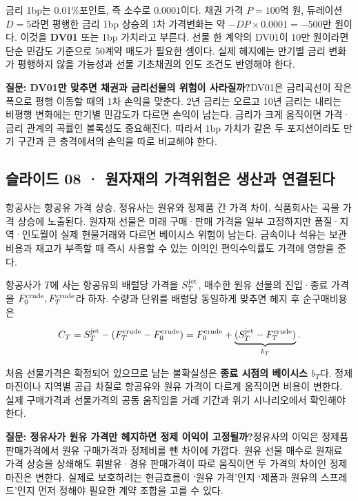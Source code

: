 \documentclass[11pt,a4paper]{article}
\begin{document}
금리 1bp는 0.01\%포인트, 즉 소수로 $0.0001$이다. 채권 가격 $P=100$억 원, 듀레이션 $D=5$라면 평행한 금리 1bp 상승의 1차 가격변화는 약 $-DP\times0.0001=-500$만 원이다. 이것을 \textbf{DV01} 또는 1bp 가치라고 부른다. 선물 한 계약의 DV01이 10만 원이라면 단순 민감도 기준으로 50계약 매도가 필요한 셈이다. 실제 헤지에는 만기별 금리 변화가 평행하지 않을 가능성과 선물 기초채권의 인도 조건도 반영해야 한다.\par

\par\medskip\noindent\textbf{질문: DV01만 맞추면 채권과 금리선물의 위험이 사라질까?}\quad DV01은 금리곡선이 작은 폭으로 평행 이동할 때의 1차 손익을 맞춘다. 2년 금리는 오르고 10년 금리는 내리는 비평행 변화에는 만기별 민감도가 다르면 손익이 남는다. 금리가 크게 움직이면 가격·금리 관계의 곡률인 볼록성도 중요해진다. 따라서 1bp 가치가 같은 두 포지션이라도 만기 구간과 큰 충격에서의 손익을 따로 비교해야 한다.\par

\subsection{슬라이드 08 · 원자재의 가격위험은 생산과 연결된다}
항공사는 항공유 가격 상승, 정유사는 원유와 정제품 간 가격 차이, 식품회사는 곡물 가격 상승에 노출된다. 원자재 선물은 미래 구매·판매 가격을 일부 고정하지만 품질·지역·인도월이 실제 현물거래와 다르면 베이시스 위험이 남는다. 금속이나 석유는 보관비용과 재고가 부족할 때 즉시 사용할 수 있는 이익인 편익수익률도 가격에 영향을 준다.\par

항공사가 $T$에 사는 항공유의 배럴당 가격을 $S_T^{\rm jet}$, 매수한 원유 선물의 진입·종료 가격을 $F_0^{\rm crude},F_T^{\rm crude}$라 하자. 수량과 단위를 배럴당 동일하게 맞추면 헤지 후 순구매비용은\par

\[
C_T=S_T^{\rm jet}-(F_T^{\rm crude}-F_0^{\rm crude})
=F_0^{\rm crude}+\underbrace{(S_T^{\rm jet}-F_T^{\rm crude})}_{b_T}.
\]

처음 선물가격은 확정되어 있으므로 남는 불확실성은 \textbf{종료 시점의 베이시스 $b_T$}다. 정제마진이나 지역별 공급 차질로 항공유와 원유 가격이 다르게 움직이면 비용이 변한다. 실제 구매가격과 선물가격의 공동 움직임을 거래 기간과 위기 시나리오에서 확인해야 한다.\par

\par\medskip\noindent\textbf{질문: 정유사가 원유 가격만 헤지하면 정제 이익이 고정될까?}\quad 정유사의 이익은 정제품 판매가격에서 원유 구매가격과 정제비를 뺀 차이에 가깝다. 원유 선물 매수로 원재료 가격 상승을 상쇄해도 휘발유·경유 판매가격이 따로 움직이면 두 가격의 차이인 정제마진은 변한다. 실제로 보호하려는 현금흐름이 ‘원유 가격’인지 ‘제품과 원유의 스프레드’인지 먼저 정해야 필요한 계약 조합을 고를 수 있다.\par
\end{document}
